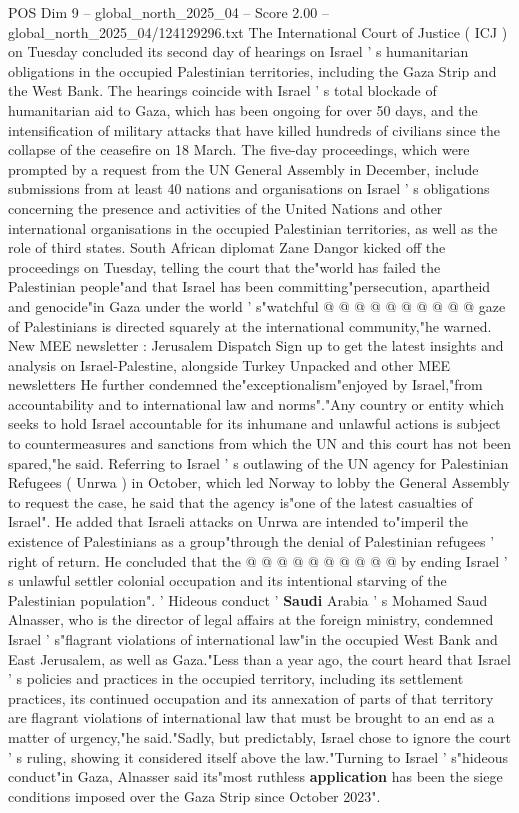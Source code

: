 \begin{textsample}{POS Dim 9 – global\_north\_2025\_04 – Score 2.00 – global\_north\_2025\_04/124129296.txt}  \label{ex:f9_pos_315}
The International Court of Justice ( ICJ ) on Tuesday concluded its second day of hearings on Israel ' s humanitarian obligations in the occupied Palestinian territories, including the Gaza Strip and the West Bank.
The hearings coincide with Israel ' s total blockade of humanitarian aid to Gaza, which has been ongoing for over 50 days, and the intensification of military attacks that have killed hundreds of civilians since the collapse of the ceasefire on 18 March.
The five-day proceedings, which were prompted by a request from the UN General Assembly in December, include submissions from at least 40 nations and organisations on Israel ' s obligations concerning the presence and activities of the United Nations and other international organisations in the occupied Palestinian territories, as well as the role of third states.
South African diplomat Zane Dangor kicked off the proceedings on Tuesday, telling the court that the"world has failed the Palestinian people"and that Israel has been committing"persecution, apartheid and genocide"in Gaza under the world ' s"watchful @ @ @ @ @ @ @ @ @ @ gaze of Palestinians is directed squarely at the international community,"he warned.
New MEE newsletter : Jerusalem Dispatch Sign up to get the latest insights and analysis on Israel-Palestine, alongside Turkey Unpacked and other MEE newsletters He further condemned the"exceptionalism"enjoyed by Israel,"from accountability and to international law and norms"."Any country or entity which seeks to hold Israel accountable for its inhumane and unlawful actions is subject to countermeasures and sanctions from which the UN and this court has not been spared,"he said.
Referring to Israel ' s outlawing of the UN agency for Palestinian Refugees ( Unrwa ) in October, which led Norway to lobby the General Assembly to request the case, he said that the agency is"one of the latest casualties of Israel".
He added that Israeli attacks on Unrwa are intended to"imperil the existence of Palestinians as a group"through the denial of Palestinian refugees ' right of return.
He concluded that the @ @ @ @ @ @ @ @ @ @ by ending Israel ' s unlawful settler colonial occupation and its intentional starving of the Palestinian population". ' Hideous conduct ' \textbf{Saudi} Arabia ' s Mohamed Saud Alnasser, who is the director of legal affairs at the foreign ministry, condemned Israel ' s"flagrant violations of international law"in the occupied West Bank and East Jerusalem, as well as Gaza."Less than a year ago, the court heard that Israel ' s policies and practices in the occupied territory, including its settlement practices, its continued occupation and its annexation of parts of that territory are flagrant violations of international law that must be brought to an end as a matter of urgency,"he said."Sadly, but predictably, Israel chose to ignore the court ' s ruling, showing it considered itself above the law."Turning to Israel ' s"hideous conduct"in Gaza, Alnasser said its"most ruthless \textbf{application} has been the siege conditions imposed over the Gaza Strip since October 2023".

\end{textsample}

